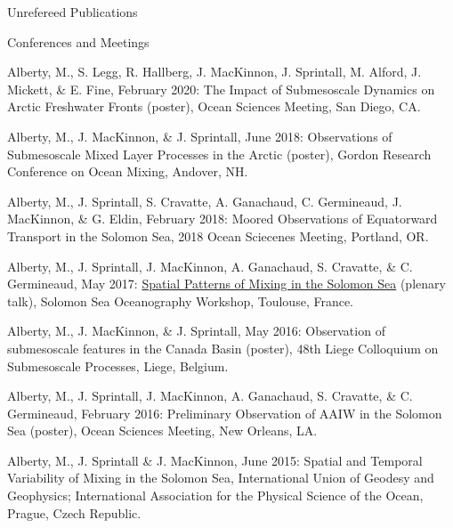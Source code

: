\documentclass{resume} %
\begin{document}
\begin{rSection}{Unrefereed Publications}
\begingroup
\renewcommand{\section}[2]{}
\endgroup
\end{rSection}

\begin{rSection}{Conferences and Meetings} 
\item Alberty, M., S. Legg, R. Hallberg, J. MacKinnon, J. Sprintall, M. Alford, J. Mickett, \& E. Fine, February 2020: The Impact of Submesoscale Dynamics on Arctic Freshwater Fronts (poster), Ocean Sciences Meeting, San Diego, CA.
\item Alberty, M., J. MacKinnon, \& J. Sprintall, June 2018: Observations of Submesoscale Mixed Layer Processes in the Arctic (poster), Gordon Research Conference on Ocean Mixing, Andover, NH.
\item Alberty, M., J. Sprintall, S. Cravatte, A. Ganachaud, C. Germineaud, J. MacKinnon, \& G. Eldin, February 2018: Moored Observations of Equatorward Transport in the Solomon Sea, 2018 Ocean Sciecenes Meeting, Portland, OR.
\item Alberty, M., J. Sprintall, J. MacKinnon, A. Ganachaud, S. Cravatte, \& C. Germineaud, May 2017: \href{http://www.legos.obs-mip.fr/members/cravatte/alberty-talk}{Spatial Patterns of Mixing in the Solomon Sea} (plenary talk), Solomon Sea Oceanography Workshop, Toulouse, France. 
\item Alberty, M., J. MacKinnon, \& J. Sprintall, May 2016: Observation of submesoscale features in the Canada Basin (poster), 48th Liege Colloquium on Submesoscale Processes, Liege, Belgium.
\item Alberty, M., J. Sprintall, J. MacKinnon, A. Ganachaud, S. Cravatte, \& C. Germineaud, February 2016: Preliminary Observation of AAIW in the Solomon Sea (poster), Ocean Sciences Meeting, New Orleans, LA. 
\item Alberty, M., J. Sprintall \& J. MacKinnon, June 2015: Spatial and Temporal Variability of Mixing in the Solomon Sea, International Union of Geodesy and Geophysics; International Association for the Physical Science of the Ocean, Prague, Czech Republic.

\end{rSection}
\end{document}
